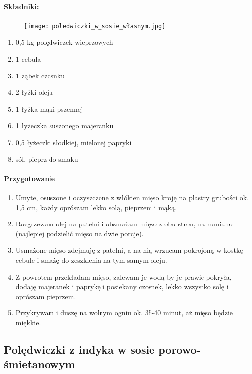 \documentclass{article}
\begin{document}
    \paragraph{Składniki:}
    \begin{figure}
        \texttt{[image: poledwiczki\_w\_sosie\_własnym.jpg]}
    \end{figure}
    \begin{enumerate}
        \item 0,5 kg polędwiczek wieprzowych
        \item 1 cebula
        \item 1 ząbek czosnku
        \item 2 łyżki oleju
        \item 1 łyżka mąki pszennej
        \item 1 łyżeczka suszonego majeranku
        \item 0,5 łyżeczki słodkiej, mielonej papryki
        \item sól, pieprz do smaku
    \end{enumerate}

    \paragraph{Przygotowanie}
    \begin{enumerate}
        \item Umyte, osuszone i oczyszczone z włókien mięso kroję na plastry
            grubości ok. 1,5 cm, każdy oprószam lekko solą, pieprzem i mąką.
        \item Rozgrzewam olej na patelni i obsmażam mięso z obu stron, na
            rumiano (najlepiej podzielić mięso na dwie porcje).
        \item Usmażone mięso zdejmuję z patelni, a na nią wrzucam pokrojoną w
            kostkę cebule i smażę do zeszklenia na tym samym oleju.
        \item Z powrotem przekładam mięso, zalewam je wodą by je prawie pokryła,
            dodaję majeranek i paprykę i posiekany czosnek, lekko wszystko solę
            i oprószam pieprzem.
        \item Przykrywam i duszę na wolnym ogniu ok. 35-40 minut, aż mięso
            będzie miękkie.
    \end{enumerate}
    \newpage


    \subsection{Polędwiczki z indyka w sosie porowo-śmietanowym}
    \bigskip
\end{document}
